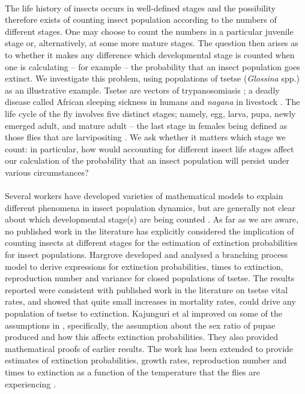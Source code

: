 \documentclass[smallextended]{svjour3}
\begin{document}
\paragraph{}
The life history of insects occurs in well-defined stages and the possibility therefore exists of counting insect population according to the numbers of different stages. One may choose to count the numbers in a particular juvenile stage or, alternatively, at some more mature stages. The question then arises as to whether it makes any difference which developmental stage is counted when one is calculating – for example – the probability that an insect population goes extinct.  We investigate this problem, using populations of tsetse (\textit{Glossina} spp.) as an illustrative example. Tsetse are vectors of trypanosomiasis \cite{Wamwiri2016,Kioy2004}; a deadly disease called African sleeping sickness in humans and \textit{nagana} in livestock \cite{Kioy2004}. The life cycle of the fly involves five distinct stages; namely, egg, larva, pupa, newly emerged adult, and mature adult – the last stage in females being defined as those flies that are larvipositing \cite{Ackley2017a}. We ask whether it matters which stage we count: in particular, how would accounting for different insect life stages affect our calculation of the probability that an insect population will persist under various circumstances? 
\paragraph{}
Several workers have developed varieties of mathematical models to explain different phenomena in insect population dynamics, but are generally not clear about which developmental stage(s) are being counted \cite{Ylioja1999,Artzrouni2003,Hargrove2005a,Adams2005,Barclay2011d,Peck2012a,Lin2015,Kajunguri2019}.  As far as we are aware, no published work in the literature has explicitly considered the implication of counting insects at different stages for the estimation of extinction probabilities for insect populations. Hargrove \cite{Hargrove2005a} developed and analysed a branching process model to derive expressions for extinction probabilities, times to extinction, reproduction number and variance for closed populations of tsetse. The results reported were consistent with published work in the literature on tsetse vital rates, and showed that quite small increases in mortality rates,  could drive any population of tsetse to extinction. Kajunguri et al \cite{Kajunguri2019} improved on some of the assumptions in \cite{Hargrove2005a}, specifically, the assumption about the sex ratio of pupae produced and how this affects extinction probabilities. They also provided mathematical proofs of earlier results. The work has been extended to provide estimates of extinction probabilities, growth rates, reproduction number and times to extinction as a function of the temperature that the flies are experiencing \cite{Are2019}. 
\end{document}
